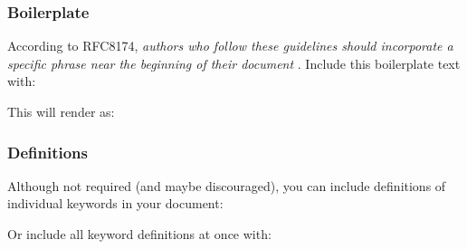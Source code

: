 \subsubsection{Boilerplate}\label{boilerplate}

According to RFC8174, \emph{authors who follow these guidelines should
incorporate a specific phrase near the beginning of their document} .
Include this boilerplate text with:

\begin{Shaded}
\begin{Highlighting}[]
\end{Highlighting}
\end{Shaded}

This will render as:

\begin{Shaded}
\begin{Highlighting}[]
\end{Highlighting}
\end{Shaded}

\subsubsection{Definitions}\label{definitions}

Although not required (and maybe discouraged), you can include
definitions of individual keywords in your document:

\begin{Shaded}
\begin{Highlighting}[]
\end{Highlighting}
\end{Shaded}

Or include all keyword definitions at once with:

\begin{Shaded}
\begin{Highlighting}[]
\end{Highlighting}
\end{Shaded}

